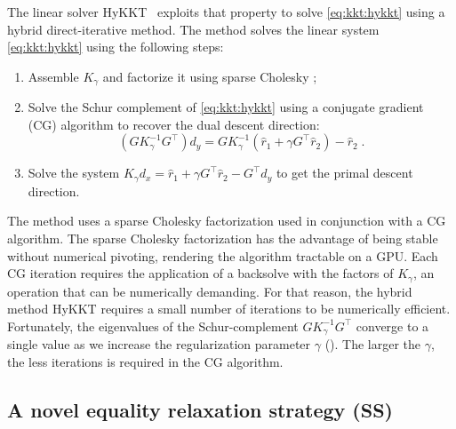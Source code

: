 The linear solver HyKKT~\cite{regev2023hykkt}
exploits that property to solve \eqref{eq:kkt:hykkt} using a hybrid
direct-iterative method. The method solves the linear system
\eqref{eq:kkt:hykkt} using the following steps:
\begin{enumerate}
  \item Assemble $K_\gamma$ and factorize it using sparse Cholesky ;
  \item Solve the Schur complement of \eqref{eq:kkt:hykkt} using a conjugate gradient (CG)
    algorithm to recover the dual descent direction:
    \begin{equation}
      (G K_\gamma^{-1} G^\top) d_y = G K_\gamma^{-1} (\hat{r}_1 + \gamma G^\top \hat{r}_2) - \hat{r}_2 \; .
    \end{equation}
  \item Solve the system $K_\gamma d_x = \hat{r}_1 + \gamma G^\top \hat{r}_2 - G^\top d_y$
    to get the primal descent direction.
\end{enumerate}
The method uses a sparse Cholesky factorization used in conjunction with a CG algorithm.
The sparse Cholesky factorization has the advantage of being stable without
numerical pivoting, rendering the algorithm tractable on a GPU.
Each CG iteration requires the application of a backsolve with the
factors of $K_\gamma$, an operation that can be numerically demanding. For that reason, the
hybrid method HyKKT requires a small number of iterations to be numerically efficient.
Fortunately, the eigenvalues of the Schur-complement $G K_\gamma^{-1} G^\top$
converge to a single value as we increase the regularization parameter
$\gamma$ (\cite[Theorem 4]{regev2023hykkt}). The larger the $\gamma$, the less iterations is required in the CG algorithm.


\subsection{A novel equality relaxation strategy (SS)}

